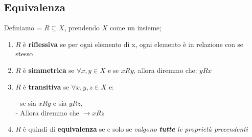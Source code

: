 \documentclass[article,12pt]{book}
\begin{document}
\begin{enumerate}
{\subsection{Equivalenza}
Definiamo = $R \subseteq X$, prendendo $X$ come un insieme;
    \begin{enumerate}
        \item $R$ è \textbf{riflessiva} se per ogni elemento di x, ogni elemento è in relazione con se stesso
        \item $R$ è \textbf{simmetrica} se $\forall x, y \in X$ e se $xRy$, allora diremmo che: $yRx$
        \item $R$ è \textbf{transitiva} se $\forall x, y, z \in X$ e:
            \begin{center}
                - se sia $xRy$ e sia $yRz$, \\
                - Allora diremmo che $\rightarrow xRz$
            \end{center}
        \item $R$ è quindi di \textbf{equivalenza} se e solo se \textit{valgono \textbf{tutte} le proprietà precendenti}
    \end{enumerate}
}
\end{enumerate}
\end{document}
